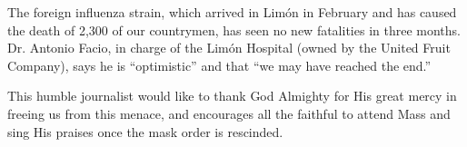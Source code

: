 
The foreign influenza strain, which arrived in Limón in February and
has caused the death of 2,300 of our countrymen, has seen no new
fatalities in three months.  Dr. Antonio Facio, in charge of the Limón
Hospital (owned by the United Fruit Company), says he is
``optimistic'' and that ``we may have reached the end.''

This humble journalist would like to thank God Almighty for His great
mercy in freeing us from this menace, and encourages all the faithful
to attend Mass and sing His praises once the mask order is rescinded.
